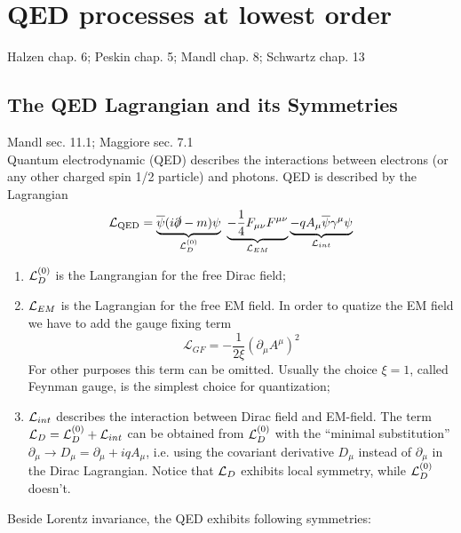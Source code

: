 \documentclass[TheoreticalPhy_ModB.tex]{subfiles}
\begin{document}
\chapter{QED processes at lowest order} %

\textsf{Halzen chap. 6; Peskin chap. 5; Mandl chap. 8; Schwartz chap. 13}

\section{The QED Lagrangian and its Symmetries}
\textsf{Mandl sec. 11.1; Maggiore sec. 7.1}\\

Quantum electrodynamic (QED) describes the interactions between electrons (or any other charged spin 1/2 particle) and photons. QED is described by the Lagrangian
\[
\mathL_{\text{QED}} =\underbrace{\overline{\psi }( i\slashed \partial -m) \psi}_{\mathcal{L}^{( 0)}_{D}} \ \underbrace{-\frac{1}{4} F_{\mu \nu } F^{\mu \nu }}_{\mathcal{L}_{EM}} \underbrace{-qA_{\mu}\overline{\psi } \gamma ^{\mu } \psi }_{\mathcal{L}_{int}}
\]
\begin{enumerate}
\item $\mathcal{L}_D^{(0)}$ is the Langrangian for the free Dirac field;
\item $\mathcal{L}_{EM}$ is the Lagrangian for the free EM field. In order to quatize the EM field we have to add the gauge fixing term
\[
\mathcal{L}_{GF}=-\frac{1}{2\xi }\left( \partial _{\mu } A^{\mu }\right)^{2}
\]
For other purposes this term can be omitted. Usually the choice $\xi = 1$, called Feynman gauge, is the simplest choice for quantization;
\item $\mathcal{L}_{int}$ describes the interaction between Dirac field and EM-field. The term $\mathcal{L}_D = \mathcal{L}_D^{(0)} + \mathcal{L}_{int}$ can be obtained from $\mathcal{L}_D^{(0)}$ with the ``minimal substitution'' $\partial_{\mu} \to D_{\mu}=\partial_{\mu} + iqA_{\mu}$, i.e. using the covariant derivative $D_{\mu}$ instead of $\partial_{\mu}$ in the Dirac Lagrangian.
Notice that $\mathcal{L}_D$ exhibits local symmetry, while $\mathcal{L}_D^{(0)}$ doesn't.
\end{enumerate}
Beside Lorentz invariance, the QED exhibits following symmetries:
\end{document}

